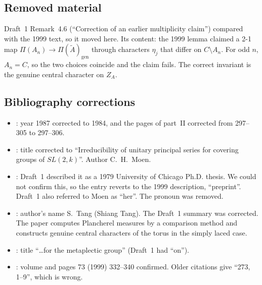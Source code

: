 \documentclass[12pt,letterpaper]{article}
\newcommand{\At}{\widetilde A}
\newcommand{\ZA}{Z_A}
\begin{document}
\subsection{Removed material}\label{subsec:removed}
Draft~1 Remark~4.6 (``Correction of an earlier multiplicity claim'')
compared with the 1999 text, so it moved here. Its content: the 1999
lemma claimed a 2-1 map $\Pi(A_n)\to\Pi(\At)_{\mathrm{gen}}$ through
characters $\eta_j$ that differ on $C\setminus A_n$. For odd $n$,
$A_n=C$, so the two choices coincide and the claim fails. The correct
invariant is the genuine central character on $\ZA$.

\subsection{Bibliography corrections}
\begin{itemize}[leftmargin=*]
\item [Ma84a, Ma84b]: year 1987 corrected to 1984, and the pages of
  part~II corrected from 297--305 to 297--306.
\item [Mo88]: title corrected to ``Irreducibility of unitary principal
  series for covering groups of $SL(2,k)$''. Author C.~H.~Moen.
\item [Mo]: Draft~1 described it as a 1979 University of Chicago
  Ph.D. thesis. We could not confirm this, so the entry reverts to the
  1999 description, ``preprint''. Draft~1 also referred to Moen as
  ``her''. The pronoun was removed.
\item [Ta17]: author's name S.~Tang (Shiang Tang). The Draft~1
  summary was corrected. The paper computes Plancherel measures by a
  comparison method and constructs genuine central characters of the
  torus in the simply laced case.
\item [GS75]: title ``\dots for the metaplectic group'' (Draft~1 had
  ``on'').
\item [Jo99]: volume and pages 73 (1999) 332--340 confirmed. Older
  citations give ``273, 1--9'', which is wrong.
\end{itemize}
\end{document}
